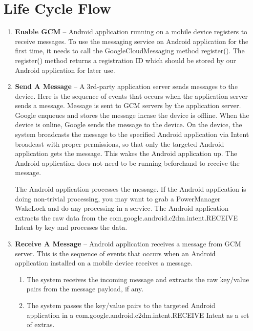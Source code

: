 \section{Life Cycle Flow}
\begin{enumerate}
   \item\textbf {Enable GCM} – Android application running on a mobile device registers to receive messages. To use the messaging service on Android application for the first time, it needs to call the GoogleCloudMessaging method register(). The register() method returns a registration ID which should be stored by our Android application for later use.
   
   \item\textbf {Send A Message} – A 3rd-party application server sends messages to the device. Here is the sequence of events that occurs when the application server sends a message. Message is sent to GCM servers by the application server. Google enqueues and stores the message incase the device is offline. When the device is online, Google sends the message to the device. On the device, the system broadcasts the message to the specified Android application via Intent broadcast with proper permissions, so that only the targeted Android application gets the message. This wakes the Android application up. The Android application does not need to be running beforehand to receive the message. 
   
   The Android application processes the message. If the Android application is doing non-trivial processing, you may want to grab a PowerManager WakeLock and do any processing in a service. The Android application extracts the raw data from the com.google.android.c2dm.intent.RECEIVE Intent by key and processes the data.
        
   \item\textbf {Receive A Message} – Android application receives a message from GCM server. This is the sequence of events that occurs when an Android application installed on a mobile device receives a message.
   
   \begin{enumerate}
      \item  The system receives the incoming message and extracts the raw key/value pairs from the message payload, if any.
      \item The system passes the key/value pairs to the targeted Android application in a com.google.android.c2dm.intent.RECEIVE Intent as a set of extras.
   \end{enumerate}



\end{enumerate}
